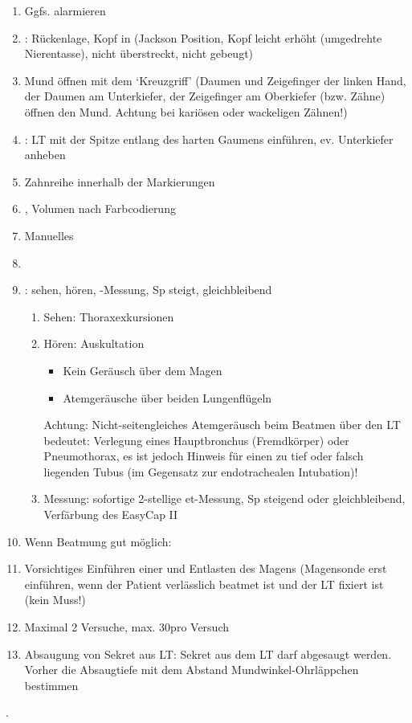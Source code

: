 \documentclass[
ngerman,
paper=a4,
asymmetric,
fontsize=10pt,
draft=false,
numbers=noenddot,
bibtotocnumbered,
footnotes=multiple,
]{scrreprt}
\newcommand{\jNEU}{\vspace{6pt}\noindent{\color{green}\sffamily\textbf{ADDED}\hrulefill\newline}}
\newcommand{\jNEUende}{\newline{\color{green}\rule{\linewidth}{3pt}\newline}}
\begin{document}
\jNEU
 \begin{enumerate}\CorrectionListsBox
  \item Ggfs.  alarmieren
   \item {}: Rückenlage, Kopf in
    (Jackson Position, Kopf
   leicht erhöht (umgedrehte Nierentasse), nicht überstreckt,
   nicht gebeugt)
   \item Mund öffnen mit dem
   \enquote*{Kreuzgriff} (Daumen und Zeigefinger der linken
   Hand, der Daumen am Unterkiefer, der Zeigefinger am
   Oberkiefer (bzw. Zähne) öffnen den Mund. Achtung bei
   kariösen oder wackeligen Zähnen!)
   \item {}: LT mit der Spitze
   entlang des harten Gaumens einführen, ev. Unterkiefer
   anheben
   \item Zahnreihe innerhalb der Markierungen
   \item
   , Volumen nach Farbcodierung
   \item Manuelles
   \item {}
   \item {}: sehen,
   hören, -Messung, Sp steigt, gleichbleibend
   \begin{enumerate}
     \item Sehen: Thoraxexkursionen
   \item Hören: Auskultation\begin{itemize}
      \item Kein Geräusch über dem
    Magen
    \item Atemgeräusche über beiden Lungenflügeln
    \end{itemize}
    Achtung: Nicht-seitengleiches Atemgeräusch beim
    Beatmen über den LT bedeutet: Verlegung eines
    Hauptbronchus (Fremdkörper) oder Pneumothorax, es ist
    jedoch  Hinweis für einen zu tief oder falsch
    liegenden Tubus (im Gegensatz zur endotrachealen
    Intubation)!
    \item Messung: sofortige 2-stellige et-Messung,
     Sp steigend oder gleichbleibend, Verfärbung des EasyCap
     II
   \end{enumerate}
   \item Wenn Beatmung gut möglich: 
   \item Vorsichtiges Einführen einer  und Entlasten des
   Magens (Magensonde erst einführen, wenn der Patient
   verlässlich beatmet ist und der LT fixiert ist (kein Muss!)
   \item Maximal 2 Versuche, max. 30\Sec* pro Versuch
   \item Absaugung von Sekret aus LT: Sekret aus dem LT  darf
   abgesaugt werden. Vorher die Absaugtiefe mit dem Abstand
   Mundwinkel-Ohrläppchen bestimmen
 \end{enumerate}
.
\jNEUende
\end{document}
